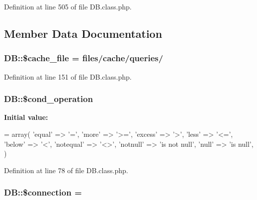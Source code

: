 Definition at line 505 of file D\+B.\+class.\+php.



\subsection{Member Data Documentation}
\hypertarget{classDB_a9952a27cbf07942e5bb8853ab95b5bdb}{}
\subsubsection[{\$cache\+\_\+file}]{\setlength{\rightskip}{0pt plus 5cm}D\+B\+::\$cache\+\_\+file = \textquotesingle{}files/cache/queries/\textquotesingle{}}\label{classDB_a9952a27cbf07942e5bb8853ab95b5bdb}


Definition at line 151 of file D\+B.\+class.\+php.

\hypertarget{classDB_a85f8f65c37474b0e65d844e1f01f39b0}{}
\subsubsection[{\$cond\+\_\+operation}]{\setlength{\rightskip}{0pt plus 5cm}D\+B\+::\$cond\+\_\+operation}\label{classDB_a85f8f65c37474b0e65d844e1f01f39b0}
{\bfseries Initial value\+:}
\begin{DoxyCode}
= array(
        \textcolor{stringliteral}{'equal'} => \textcolor{charliteral}{'='},
        \textcolor{stringliteral}{'more'} => \textcolor{stringliteral}{'>='},
        \textcolor{stringliteral}{'excess'} => \textcolor{charliteral}{'>'},
        \textcolor{stringliteral}{'less'} => \textcolor{stringliteral}{'<='},
        \textcolor{stringliteral}{'below'} => \textcolor{charliteral}{'<'},
        \textcolor{stringliteral}{'notequal'} => \textcolor{stringliteral}{'<>'},
        \textcolor{stringliteral}{'notnull'} => \textcolor{stringliteral}{'is not null'},
        \textcolor{stringliteral}{'null'} => \textcolor{stringliteral}{'is null'},
    )
\end{DoxyCode}


Definition at line 78 of file D\+B.\+class.\+php.

\hypertarget{classDB_ac9071e31f8241ad644430537f39a16ce}{}
\subsubsection[{\$connection}]{\setlength{\rightskip}{0pt plus 5cm}D\+B\+::\$connection = \textquotesingle{}\textquotesingle{}}\label{classDB_ac9071e31f8241ad644430537f39a16ce}


